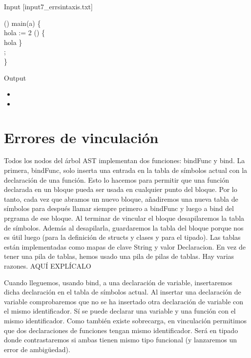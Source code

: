 Input [input7\_errsintaxis.txt]
\begin{algorithm}
	\Integer{}(\Integer{}) main(a) \{ \\
	\quad \Integer{} hola := 2\;
	\quad \Whilee{} (\Integer{}) \{ \\
	\quad \quad hola\operator{++}\;
	\quad \} \\
	\quad	\Returnn {};\\
	\}\;
\end{algorithm}

Output

\begin{itemize}
	\item {}
	\item {}
\end{itemize}
\newpage
\section{Errores de vinculación}

Todos los nodos del árbol AST implementan dos funciones: bindFunc y bind. La primera, bindFunc,
solo inserta una entrada en la tabla de símbolos actual con la declaración de una función. Esto lo
hacemos para permitir que una función declarada en un bloque pueda ser usada en cualquier punto del
bloque. Por lo tanto, cada vez que abramos un nuevo bloque, añadiremos una nueva tabla de símbolos
para después llamar siempre primero a bindFunc y luego a bind del prgrama de ese bloque. Al terminar
de vincular el bloque desapilaremos la tabla de símbolos. Además al desapilarla, guardaremos la tabla
del bloque porque nos es útil luego (para la definición de structs y clases y para el tipado). Las tablas 
están implementadas como mapas de clave String y valor Declaracion. En vez de tener una pila de tablas,
hemos usado una pila de pilas de tablas. Hay varias razones. AQUÍ EXPLÍCALO 

Cuando lleguemos, usando bind, a una declaración de variable, insertaremos dicha declaración en el tabla de 
símbolos actual. Al insertar una declaración de variable comprobaremos que no se ha insertado otra declaración
de variable con el mismo identificador. Sí se puede declarar una variable y una función con el mismo identificador.
Como también existe sobrecarga, en vinculación permitimos que dos declaraciones de funciones tengan mismo
identificador. Será en tipado donde contrastaremos si ambas tienen mismo tipo funcional (y lanzaremos un error
de ambigüedad).

